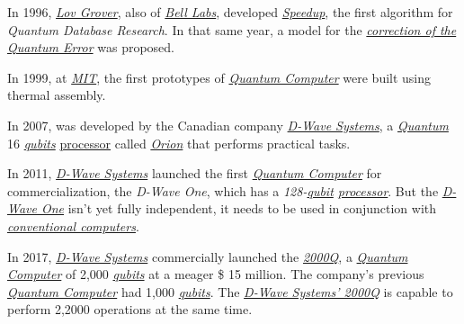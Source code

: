 \documentclass[conference]{IEEEtran}
\begin{document}
\vspace{4pt}

In 1996, \href{https://en.wikipedia.org/wiki/Lov_Grover}{\textit{Lov Grover}}, also of \href{https://en.wikipedia.org/wiki/Bell_Labs}{\textit{Bell Labs}}, developed \href{https://en.wikipedia.org/wiki/Amdahl\%27s_law}{\textit{Speedup}}, the first algorithm for \textit{Quantum Database Research}. In that same year, a model for the \href{https://en.wikipedia.org/wiki/Quantum_error_correction}{\textit{correction of the Quantum Error}} was proposed. \cite{b4}

\vspace{4pt}

In 1999, at \href{https://en.wikipedia.org/wiki/Massachusetts_Institute_of_Technology}{\textit{MIT}}, the first prototypes of \href{https://en.wikipedia.org/wiki/Quantum_computing}{\textit{Quantum Computer}} were built using thermal assembly.

\vspace{4pt}

In 2007, was developed by the Canadian company \href{https://en.wikipedia.org/wiki/D-Wave_Systems}{\textit{D-Wave Systems}}, a \href{https://en.wikipedia.org/wiki/Quantum}{\textit{Quantum}} 16 \href{https://en.wikipedia.org/wiki/Qubit}{\textit{qubits}} \href{https://en.wikipedia.org/wiki/Processor_(computing)}{processor} called \href{https://www.eetimes.com/document.asp?doc_id=1165219#}{\textit{Orion}} that performs practical tasks.

\vspace{4pt}

In 2011, \href{https://en.wikipedia.org/wiki/D-Wave_Systems}{\textit{D-Wave Systems}} launched the first \href{https://en.wikipedia.org/wiki/Quantum_computing}{\textit{Quantum Computer}} for commercialization, the \textit{D-Wave One}, which has a \textit{128-\href{https://en.wikipedia.org/wiki/Qubit}{qubit} \href{https://en.wikipedia.org/wiki/Processor_(computing)}{processor}}. But the \href{https://en.wikipedia.org/wiki/D-Wave_Systems#D-Wave_One}{\textit{D-Wave One}} isn't yet fully independent, it needs to be used in conjunction with \href{https://en.wikipedia.org/wiki/Von_Neumann_architecture}{\textit{conventional computers}}.

\vspace{4pt}

In 2017, \href{https://en.wikipedia.org/wiki/D-Wave_Systems}{\textit{D-Wave Systems}} commercially launched the \href{https://www.dwavesys.com/d-wave-two-system}{\textit{2000Q}}, a \href{https://en.wikipedia.org/wiki/Quantum_computing}{\textit{Quantum Computer}} of 2,000 \href{https://en.wikipedia.org/wiki/Qubit}{\textit{qubits}} at a meager \$ 15 million. The company's previous \href{https://en.wikipedia.org/wiki/Quantum_computing}{\textit{Quantum Computer}} had 1,000 \href{https://en.wikipedia.org/wiki/Qubit}{\textit{qubits}}. The \href{https://www.dwavesys.com/d-wave-two-system}{\textit{D-Wave Systems' 2000Q}} is capable to perform 2,2000 operations at the same time.
\end{document}
